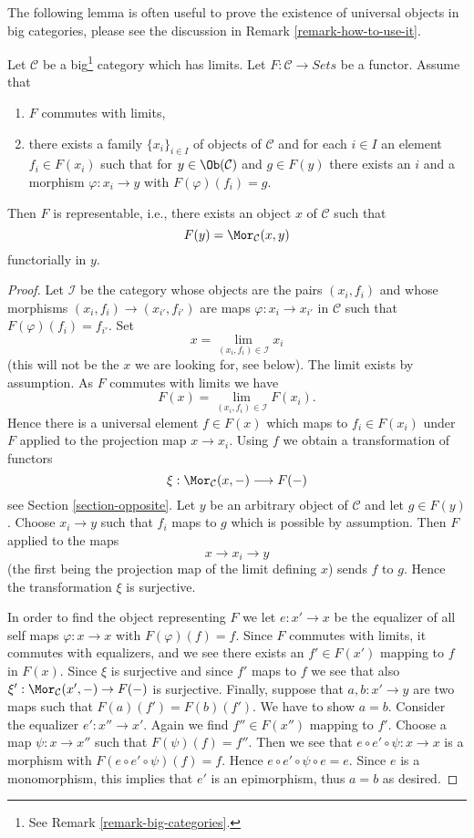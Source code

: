 \noindent
The following lemma is often useful to prove the existence of
universal objects in big categories, please see the discussion
in Remark \ref{remark-how-to-use-it}.

\begin{lemma}
\label{lemma-a-version-of-brown}
Let $\mathcal{C}$ be a big\footnote{See Remark \ref{remark-big-categories}.}
category which has limits. Let $F : \mathcal{C} \to \textit{Sets}$ be a
functor. Assume that
\begin{enumerate}
\item $F$ commutes with limits,
\item there exists a family $\{x_i\}_{i \in I}$ of objects of $\mathcal{C}$
and for each $i \in I$ an element $f_i \in F(x_i)$
such that for $y \in \Ob(\mathcal{C})$ and $g \in F(y)$
there exists an $i$ and a morphism $\varphi : x_i \to y$
with $F(\varphi)(f_i) = g$.
\end{enumerate}
Then $F$ is representable, i.e., there exists an object $x$
of $\mathcal{C}$ such that
$$
F(y) = \Mor_\mathcal{C}(x, y)
$$
functorially in $y$.
\end{lemma}

\begin{proof}
Let $\mathcal{I}$ be the category whose objects are the pairs $(x_i, f_i)$
and whose morphisms $(x_i, f_i) \to (x_{i'}, f_{i'})$ are maps
$\varphi : x_i \to x_{i'}$ in $\mathcal{C}$
such that $F(\varphi)(f_i) = f_{i'}$. Set
$$
x = \lim_{(x_i, f_i) \in \mathcal{I}} x_i
$$
(this will not be the $x$ we are looking for, see below).
The limit exists by assumption. As $F$ commutes with limits
we have
$$
F(x) = \lim_{(x_i, f_i) \in \mathcal{I}} F(x_i).
$$
Hence there is a universal element $f \in F(x)$ which maps to $f_i \in F(x_i)$
under $F$ applied to the projection map $x \to x_i$.
Using $f$ we obtain a transformation of functors
$$
\xi : \Mor_\mathcal{C}(x, - ) \longrightarrow F(-)
$$
see Section \ref{section-opposite}. Let $y$ be an arbitrary object of
$\mathcal{C}$ and let $g \in F(y)$. Choose $x_i \to y$ such that $f_i$
maps to $g$ which is possible by assumption. Then $F$ applied to the maps
$$
x \longrightarrow x_i \longrightarrow y
$$
(the first being the projection map of the limit defining $x$)
sends $f$ to $g$. Hence the transformation $\xi$ is surjective.

\medskip\noindent
In order to find the object representing $F$ we let $e : x' \to x$ be the
equalizer of all self maps $\varphi : x \to x$ with $F(\varphi)(f) = f$.
Since $F$ commutes with limits, it commutes with equalizers, and
we see there exists an $f' \in F(x')$ mapping to $f$ in $F(x)$.
Since $\xi$ is surjective and since $f'$ maps to $f$ we see that
also $\xi' : \Mor_\mathcal{C}(x', -) \to F(-)$ is surjective.
Finally, suppose that $a, b : x' \to y$ are two maps such that
$F(a)(f') = F(b)(f')$. We have to show $a = b$. Consider the equalizer
$e' : x'' \to x'$. Again we find $f'' \in F(x'')$ mapping to $f'$.
Choose a map $\psi : x \to x''$ such that $F(\psi)(f) = f''$.
Then we see that $e \circ e' \circ \psi : x \to x$ is a morphism
with $F(e \circ e' \circ \psi)(f) = f$. Hence
$e \circ e' \circ \psi \circ e = e$. Since $e$ is a monomorphism,
this implies that $e'$ is an epimorphism, thus $a = b$ as desired.
\end{proof}

